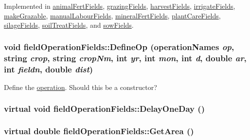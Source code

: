 Implemented in \hyperlink{classanimal_fert_fields_a086028dc45ec7c9624e80ddbb59b5271}{animalFertFields}, \hyperlink{classgrazing_fields_a512df2449aac5ed1621dd4c543857712}{grazingFields}, \hyperlink{classharvest_fields_aa252f8782663a14d3ccefff889279b36}{harvestFields}, \hyperlink{classirrigate_fields_a162b39c6de0effa998c14fa4516da08b}{irrigateFields}, \hyperlink{classmake_grazable_a52ff627730636a7a71b975a203edbf5f}{makeGrazable}, \hyperlink{classmanual_labour_fields_acbf577ca188715bf0e4413f08e6d2861}{manualLabourFields}, \hyperlink{classmineral_fert_fields_a29eb4d8ad0e09942f75f531c8b7c44b6}{mineralFertFields}, \hyperlink{classplant_care_fields_a9fc0efabe5abf7359f56514c889ca743}{plantCareFields}, \hyperlink{classsilage_fields_a143ee0ad2ae333fe8f9b8b6c119bf46d}{silageFields}, \hyperlink{classsoil_treat_fields_ac7a0bac794823169aaa85319842ce4d9}{soilTreatFields}, and \hyperlink{classsow_fields_a0feeb92725f01a4e58784ca0d7a7d98e}{sowFields}.\hypertarget{classfield_operation_fields_a5bc5560caa7ecd638172f5a7f74ffe10}{
\subsubsection[{DefineOp}]{\setlength{\rightskip}{0pt plus 5cm}void fieldOperationFields::DefineOp ({\bf operationNames} {\em op}, \/  string {\em crop}, \/  string {\em cropNm}, \/  int {\em yr}, \/  int {\em mon}, \/  int {\em d}, \/  double {\em ar}, \/  int {\em fieldn}, \/  double {\em dist})}}
\label{classfield_operation_fields_a5bc5560caa7ecd638172f5a7f74ffe10}
Define the \hyperlink{classoperation}{operation}. Should this be a constructor? \hypertarget{classfield_operation_fields_a29c2d6912bf930809a3922350b8adad6}{
\subsubsection[{DelayOneDay}]{\setlength{\rightskip}{0pt plus 5cm}virtual void fieldOperationFields::DelayOneDay ()}}
\label{classfield_operation_fields_a29c2d6912bf930809a3922350b8adad6}
\hypertarget{classfield_operation_fields_a5f64c374904b49db06079a0ebc50f315}{
\subsubsection[{GetArea}]{\setlength{\rightskip}{0pt plus 5cm}virtual double fieldOperationFields::GetArea ()}}
